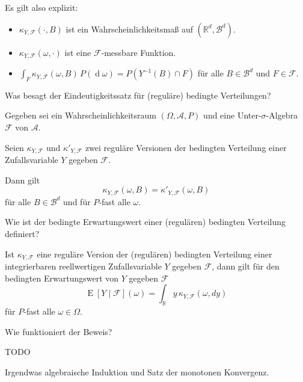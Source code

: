 \begin{QandA}
\begin{answered}
        Es gilt also explizit:
        \begin{itemize}
            \item $\kappa_{Y,{\mathcal{F}}}(\cdot, B)$ ist ein Wahrscheinlichkeitsmaß auf $(\mathbb{R}^d,{\mathcal{B}}^d)$.
            \item $\kappa_{Y,{\mathcal{F}}}(\omega, \cdot )$ ist eine $\mathcal{F}$-messbare Funktion.
            \item $\int_F \kappa_{Y,{\mathcal{F}}}(\omega, B) \, P(\operatorname{d}\omega) = P(Y^{-1}(B) \cap F)$ für alle $B \in{\mathcal{B}^d}$ und $F \in{\mathcal{F}}$.
        \end{itemize}
    \end{answered}

    \item Was besagt der Eindeutigkeitssatz für (reguläre) bedingte Verteilungen?
    \begin{answered}
        Gegeben sei ein Wahrscheinlichkeitsraum $(\Omega ,{\mathcal{A}},P)$ und eine Unter-$\sigma$-Algebra $\mathcal{F}$ von ${\mathcal{A}}$.

        Seien $\kappa_{Y,{\mathcal{F}}}$ und $\kappa'_{Y,{\mathcal{F}}}$ zwei reguläre Versionen der bedingten Verteilung einer Zufallsvariable $Y$ gegeben $\mathcal{F}$.

        Dann gilt
        \[
            \kappa_{Y,{\mathcal{F}}}(\omega ,B)=\kappa'_{Y,{\mathcal{F}}}(\omega ,B)
        \]
        für alle $B \in{\mathcal{B}^d}$ und für $P$-fast alle $\omega$.
    \end{answered}

    \item Wie ist der bedingte Erwartungswert einer (regulären) bedingten Verteilung definiert?
    \begin{answered}
        Ist $\kappa_{Y,{\mathcal{F}}}$ eine reguläre Version der (regulären) bedingten Verteilung einer integrierbaren reellwertigen Zufallsvariable $Y$ gegeben $\mathcal{F}$, dann gilt für den bedingten Erwartungswert von $Y$ gegeben $\mathcal{F}$
        \[
            \operatorname{E} [Y\mid{\mathcal{F}}](\omega )=\int_{\mathbb{R}} y\,\kappa_{Y,{\mathcal{F}}}(\omega ,dy)
        \]
        für $P$-fast alle $\omega \in \Omega$.
    \end{answered}

    \item Wie funktioniert der Beweis?
    \begin{answered}
        TODO

        Irgendwas algebraische Induktion und Satz der monotonen Konvergenz.
    \end{answered}


\end{QandA}
